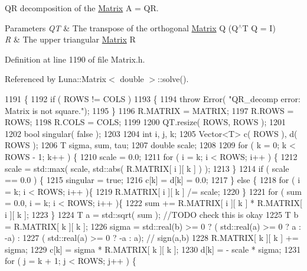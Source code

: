 QR decomposition of the \hyperlink{classLuna_1_1Matrix}{Matrix} A = QR. 


\begin{DoxyParams}{Parameters}
{\em QT} & The transpose of the orthogonal \hyperlink{classLuna_1_1Matrix}{Matrix} Q (Q$^\wedge$T Q = I) \\
\hline
{\em R} & The upper triangular \hyperlink{classLuna_1_1Matrix}{Matrix} R \\
\hline
\end{DoxyParams}


Definition at line 1190 of file Matrix.\+h.



Referenced by Luna\+::\+Matrix$<$ double $>$\+::solve().


\begin{DoxyCode}
1191   \{
1192     \textcolor{keywordflow}{if} ( ROWS != COLS )
1193     \{
1194       \textcolor{keywordflow}{throw} Error( \textcolor{stringliteral}{"QR\_decomp error: Matrix is not square."});
1195     \}
1196     R.MATRIX = MATRIX;
1197     R.ROWS = ROWS;
1198     R.COLS = COLS;
1199 
1200     QT.resize( ROWS, ROWS );
1201 
1202     \textcolor{keywordtype}{bool} singular( \textcolor{keyword}{false} );
1203 
1204     \textcolor{keywordtype}{int} i, j, k;
1205     Vector<T> c( ROWS ), d( ROWS );
1206     T sigma, sum, tau;
1207     \textcolor{keywordtype}{double} scale;
1208 
1209     \textcolor{keywordflow}{for} ( k = 0; k < ROWS - 1; k++ ) \{
1210       scale = 0.0;
1211       \textcolor{keywordflow}{for} ( i = k; i < ROWS; i++ ) \{
1212         scale = std::max( scale, std::abs( R.MATRIX[ i ][ k ] ) );
1213       \}
1214       \textcolor{keywordflow}{if} ( scale == 0.0 ) \{
1215         singular = \textcolor{keyword}{true};
1216         c[k] = d[k] = 0.0;
1217       \} \textcolor{keywordflow}{else} \{
1218         \textcolor{keywordflow}{for} ( i = k; i < ROWS; i++ )\{
1219           R.MATRIX[ i ][ k ] /= scale;
1220         \}
1221         \textcolor{keywordflow}{for} ( sum = 0.0, i = k; i < ROWS; i++ )\{
1222           sum += R.MATRIX[ i ][ k ] * R.MATRIX[ i ][ k ];
1223         \}
1224         T a = std::sqrt( sum ); \textcolor{comment}{//TODO check this is okay}
1225         T b = R.MATRIX[ k ][ k ];
1226         sigma = std::real(b) >= 0 ? ( std::real(a) >= 0 ? a : -a) :
1227                                     ( std::real(a) >= 0 ? -a : a); \textcolor{comment}{// sign(a,b)}
1228         R.MATRIX[ k ][ k ] += sigma;
1229         c[k] = sigma * R.MATRIX[ k ][ k ];
1230         d[k] = - scale * sigma;
1231         \textcolor{keywordflow}{for} ( j = k + 1; j < ROWS; j++ ) \{

\end{DoxyCode}
